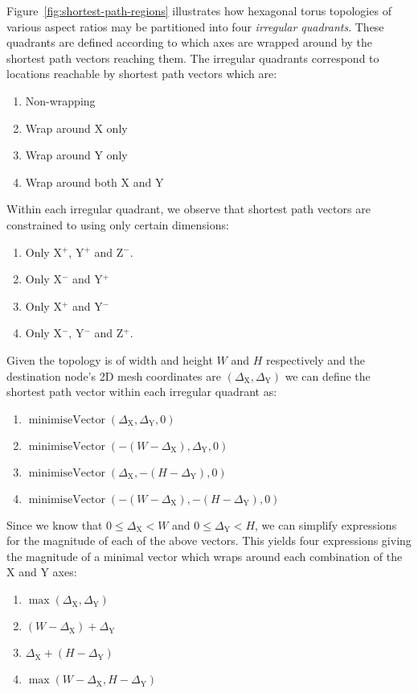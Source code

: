 			Figure~\ref{fig:shortest-path-regions} illustrates how hexagonal torus
			topologies of various aspect ratios may be partitioned into four
			\emph{irregular quadrants}. These quadrants are defined according to which
			axes are wrapped around by the shortest path vectors reaching them. The
			irregular quadrants correspond to locations reachable by shortest path
			vectors which are:
			\begin{enumerate}
				\item Non-wrapping
				\item Wrap around X only
				\item Wrap around Y only
				\item Wrap around both X and Y
			\end{enumerate}
			Within each irregular quadrant, we observe that shortest path vectors are
			constrained to using only certain dimensions:
			\begin{enumerate}
				\item Only X$^+$, Y$^+$ and Z$^-$.
				\item Only X$^-$ and Y$^+$
				\item Only X$^+$ and Y$^-$
				\item Only X$^-$, Y$^-$ and Z$^+$.
			\end{enumerate}
			Given the topology is of width and height $W$ and $H$ respectively and the
			destination node's 2D mesh coordinates are $(\Delta_\textrm{X},
			\Delta_\textrm{Y})$ we can define the shortest path vector within each
			irregular quadrant as:
			\begin{enumerate}
				\item $\operatorname{minimiseVector}(\Delta_\textrm{X},\Delta_\textrm{Y},0)$
				\item $\operatorname{minimiseVector}(-(W-\Delta_\textrm{X}),\Delta_\textrm{Y},0)$
				\item $\operatorname{minimiseVector}(\Delta_\textrm{X},-(H-\Delta_\textrm{Y}),0)$
				\item $\operatorname{minimiseVector}(-(W-\Delta_\textrm{X}),-(H-\Delta_\textrm{Y}),0)$
			\end{enumerate}
			Since we know that $0 \le \Delta_\textrm{X} < W$ and $0 \le
			\Delta_\textrm{Y} < H$, we can simplify expressions for the magnitude of
			each of the above vectors. This yields four expressions giving the
			magnitude of a minimal vector which wraps around each combination of the
			X and Y axes:
			\begin{enumerate}
				\item $\operatorname{max}(\Delta_\textrm{X}, \Delta_\textrm{Y})$
				\item $(W - \Delta_\textrm{X}) + \Delta_\textrm{Y}$
				\item $\Delta_\textrm{X} + (H - \Delta_\textrm{Y})$
				\item $\operatorname{max}(W-\Delta_\textrm{X}, H-\Delta_\textrm{Y})$
			\end{enumerate}
